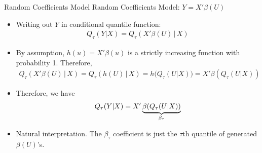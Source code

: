 \documentclass[handout]{beamer}
\begin{document}
\begin{frame}[shrink]{Random Coefficients Model}
Random Coefficients Model:
$Y = X'\beta(U)$
\begin{itemize}
  \item Writing out $Y$ in conditional quantile function:
    \begin{align*}
      Q_\tau(Y|X)
      =
      Q_\tau(X'\beta(U)\,|\,X)
    \end{align*}

  \item By assumption, $h(u)= X'\beta(u)$ is a strictly increasing
    function with probability 1.
    Therefore,
    \begin{align*}
      Q_\tau(X'\beta(U)\,|\,X)
      =
      Q_\tau(h(U)\,|\,X)
      =
      h\big(
      Q_\tau(U|X)
      \big)
      =
      X'\beta(Q_\tau(U|X))
    \end{align*}

  \item
    Therefore, we have
    \begin{align*}
      Q_\tau(Y|X)
      =
      X'
      \underbrace{%
        \beta(Q_\tau(U|X))
      }_{\beta_\tau}
    \end{align*}

  \item
    Natural interpretation.
    The $\beta_\tau$ coefficient is just the $\tau$th quantile of
    generated $\beta(U)$'s.
\end{itemize}
\end{frame}
\end{document}

